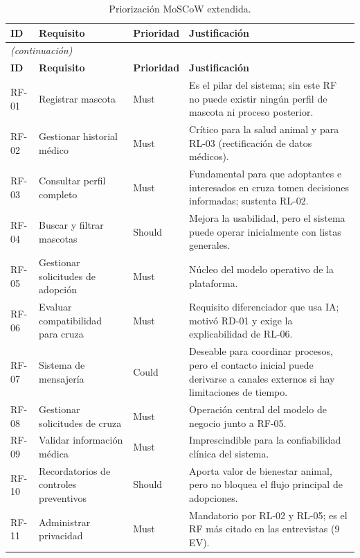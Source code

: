 \documentclass[journal,onecolumn]{IEEEtran}
\begin{document}
	\begin{longtable}{@{}p{1.6cm} p{4.8cm} p{1.6cm} p{5.2cm}@{}}
		\caption{Priorización MoSCoW extendida.}
		\label{tab:priorizacion_moscow_parcial} \\
		\hline
		\textbf{ID} & \textbf{Requisito} & \textbf{Prioridad} & \textbf{Justificación} \\
		\hline
		\endfirsthead
		\multicolumn{4}{|l|}{\textit{(continuación)}} \\
		\hline
		\textbf{ID} & \textbf{Requisito} & \textbf{Prioridad} & \textbf{Justificación} \\
		\hline
		\endhead
		\hline
		\endfoot
		RF-01 & Registrar mascota & Must & Es el pilar del sistema; sin este RF no puede existir ningún perfil de mascota ni proceso posterior. \\
		\hline
		RF-02 & Gestionar historial médico & Must & Crítico para la salud animal y para RL-03 (rectificación de datos médicos). \\
		\hline
		RF-03 & Consultar perfil completo & Must & Fundamental para que adoptantes e interesados en cruza tomen decisiones informadas; sustenta RL-02. \\
		\hline
		RF-04 & Buscar y filtrar mascotas & Should & Mejora la usabilidad, pero el sistema puede operar inicialmente con listas generales. \\
		\hline
		RF-05 & Gestionar solicitudes de adopción & Must & Núcleo del modelo operativo de la plataforma. \\
		\hline
		RF-06 & Evaluar compatibilidad para cruza & Must & Requisito diferenciador que usa IA; motivó RD-01 y exige la explicabilidad de RL-06. \\
		\hline
		RF-07 & Sistema de mensajería & Could & Deseable para coordinar procesos, pero el contacto inicial puede derivarse a canales externos si hay limitaciones de tiempo. \\
		\hline
		RF-08 & Gestionar solicitudes de cruza & Must & Operación central del modelo de negocio junto a RF-05. \\
		\hline
		RF-09 & Validar información médica & Must & Imprescindible para la confiabilidad clínica del sistema. \\
		\hline
		RF-10 & Recordatorios de controles preventivos & Should & Aporta valor de bienestar animal, pero no bloquea el flujo principal de adopciones. \\
		\hline
		RF-11 & Administrar privacidad & Must & Mandatorio por RL-02 y RL-05; es el RF más citado en las entrevistas (9 EV). \\

\end{longtable}
\end{document}
